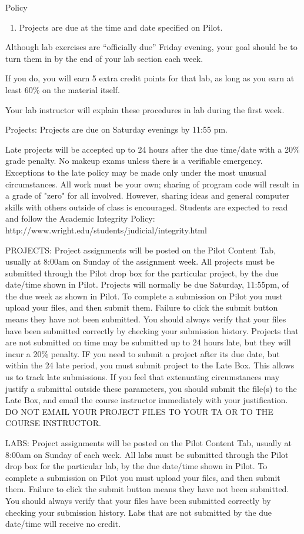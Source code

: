 \documentclass{beamer}
\begin{document}
\begin{frame}{Policy}
\begin{enumerate}
\item Projects are due at the time and date specified on Pilot. 
\end{enumerate}

Although lab exercises are 
“officially due” Friday evening, your goal should be to turn them in
by the end of your lab section each week. 

If you do, you will earn 5 extra credit points for that lab, as long
as you earn at least 60\% on the material itself.
  
Your lab instructor will explain these procedures in lab during the
first week. 

Projects:  Projects are due on Saturday evenings by 11:55 pm. 

Late projects will be accepted up to 24 hours after the due time/date with a 
20\% grade penalty. No makeup exams unless there is a verifiable emergency. Exceptions to the late policy may 
be made only under the most unusual circumstances. All work must be your own; sharing of program code will 
result in a grade of "zero" for all involved. However, sharing ideas and general computer skills with others 
outside of class is encouraged. Students are expected to read and follow the Academic Integrity Policy: 
http://www.wright.edu/students/judicial/integrity.html

PROJECTS:
Project assignments will be posted on the Pilot Content Tab, usually at 8:00am on Sunday of the 
assignment week.  
All projects must be submitted through the Pilot drop box for the particular project, by the 
due date/time shown in Pilot.  Projects will normally be due Saturday, 11:55pm, of the due week 
as shown in Pilot.
To complete a submission on Pilot you must upload your files, and then submit them.  Failure
to click the submit button means they have not been submitted.  You should always verify that 
your files have been submitted correctly by checking your submission history.
Projects that are not submitted on time may be submitted up to 24 hours late, but they will incur 
a 20\% penalty.  IF you need to submit a project after its due date, but within the 24 late period, 
you must submit project to the Late Box.  This allows us to track late submissions.
If you feel that extenuating circumstances may justify a submittal outside these parameters, you 
should submit the file(s) to the Late Box, and email the course instructor immediately with your 
justification.  DO NOT EMAIL YOUR PROJECT FILES TO YOUR TA OR TO THE 
COURSE INSTRUCTOR.  

LABS:
Project assignments will be posted on the Pilot Content Tab, usually at 8:00am on Sunday of 
each week.  
All labs must be submitted through the Pilot drop box for the particular lab, by the due 
date/time shown in Pilot. To complete a submission on Pilot you must upload your files, and 
then submit them.  Failure to click the submit button means they have not been submitted. You 
should always verify that your files have been submitted correctly by checking your submission 
history.
Labs that are not submitted by the due date/time will receive no credit.
\end{frame}
\end{document}
